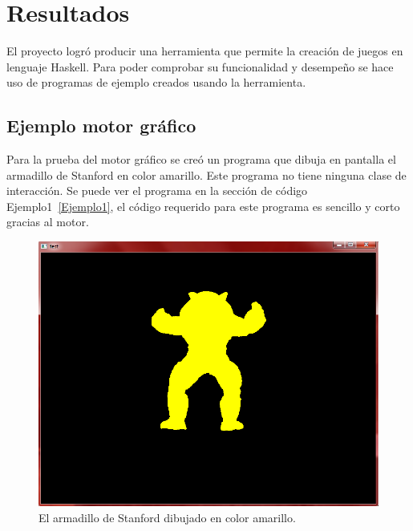 
\chapter{Resultados}
\label{capitulo5}

\ifpdf
    \graphicspath{{resultados/Figs/Raster/}{resultados/Figs/PDF/}{resultados/Figs/}}
\else
    \graphicspath{{resultados/Figs/Vector/}{resultados/Figs/}}
\fi

El proyecto logró producir una herramienta que permite la creación de juegos en lenguaje Haskell. Para poder comprobar su funcionalidad y desempeño se hace uso de programas de ejemplo creados usando la herramienta.

\section{Ejemplo motor gráfico}

Para la prueba del motor gráfico se creó un programa que dibuja en pantalla el armadillo de Stanford en color amarillo. Este programa no tiene ninguna clase de interacción. Se puede ver el programa en la sección de código Ejemplo1~\ref{Ejemplo1}, el código requerido para este programa es sencillo y corto gracias al motor.

\begin{figure}[htbp!]
\centering
\includegraphics[width=1.0\textwidth]{sceenshot1}
\caption[Ejemplo 1]{El armadillo de Stanford dibujado en color amarillo.}
\end{figure}

